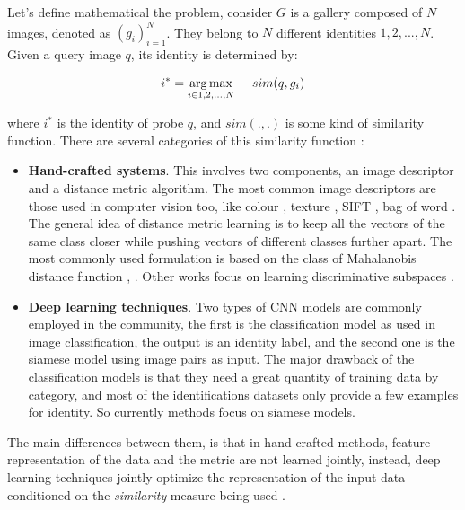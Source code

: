 Let's define mathematical the problem, consider $G$ is a gallery composed of $N$ images, denoted as $(g_{i})_{i=1}^{N}$. They belong to $N$ different identities $ 1,2,...,N $. Given a query image $q$, its identity is determined by:


$$ i^{*} = \underset{i \in 1,2,...,N}{\arg\max} \hspace{0.5cm} sim(q,g_{i}) $$

where $i^{*}$ is the identity of probe $q$, and $sim( . , . )$ is some kind of similarity function. There are several categories of this similarity function \cite{pastPresent}:

\begin{itemize}
 
\item \textbf{Hand-crafted systems}. This involves two components, an image descriptor and a distance metric algorithm. The most common image descriptors are those used in computer vision too, like colour \cite{lbp}, texture \cite{pairwise}, SIFT \cite{sift}, bag of word \cite{bagword}. The general idea of distance metric learning is to keep all the vectors of the same class closer while pushing vectors of different classes further apart. The most commonly used formulation is based on the class of Mahalanobis distance function \cite{kiisme}, \cite{lnnn}. Other works focus on learning discriminative subspaces \cite{lda}.

\item \textbf{Deep learning techniques}. Two types of CNN models are commonly employed in the community, the first is the classification model as used in image classification, the output is an identity label, and the second one is the siamese model using image pairs as input. The major drawback of the classification models is that they need a great quantity of training data by category, and most of the identifications datasets only provide a few examples for identity. So currently methods focus on siamese models.

\end{itemize} 

The main differences between them, is that in hand-crafted methods, feature representation of the data and the metric are not learned jointly, instead, deep learning techniques jointly optimize the representation of the input data conditioned on the \textit{similarity} measure being used \cite{EC1}. 





